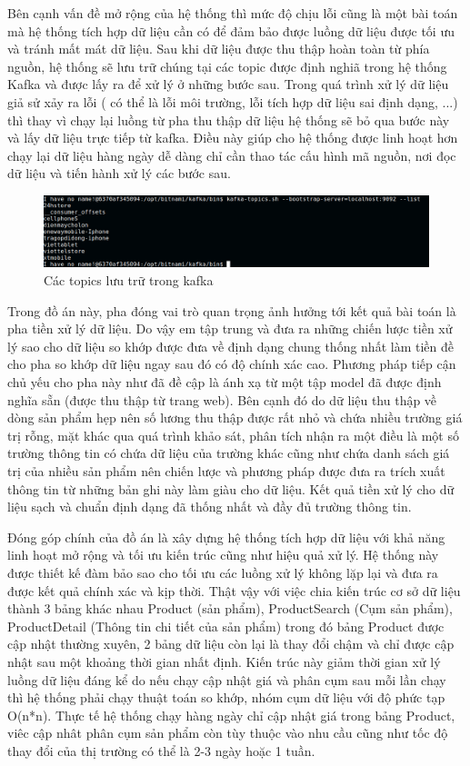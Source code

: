 \documentclass[../DoAn.tex]{subfiles}
\begin{document}
Bên cạnh vấn đề mở rộng của hệ thống thì mức độ chịu lỗi cũng là một bài toán mà hệ thống tích hợp dữ liệu cần có để đảm bảo được luồng dữ liệu được tối ưu và tránh mất mát dữ liệu. Sau khi dữ liệu được thu thập hoàn toàn từ phía nguồn, hệ thống sẽ lưu trữ chúng tại các topic được định nghiã trong hệ thống Kafka và được lấy ra để xử lý ở những bước sau. Trong quá trình xử lý dữ liệu giả sử xảy ra lỗi ( có thể là lỗi môi trường, lỗi tích hợp dữ liệu sai định dạng, ...) thì thay vì chạy lại luồng từ pha thu thập dữ liệu hệ thống sẽ bỏ qua bước này và lấy dữ liệu trực tiếp từ kafka. Điều này giúp cho hệ thống được linh hoạt hơn chạy lại dữ liệu hàng ngày dễ dàng chỉ cần thao tác cấu hình mã nguồn, nơi đọc dữ liệu và tiến hành xử lý các bước sau. 

\begin{figure}[H]
    \centering
    \includegraphics[scale=0.35]{Hinhve/kafka-topics.png}
    \caption{Các topics lưu trữ trong kafka}
    \label{fig:my_label2}
\end{figure}

Trong đồ án này, pha đóng vai trò quan trọng ảnh hưởng tới kết quả bài toán là pha tiền xử lý dữ liệu. Do vậy em tập trung và đưa ra những chiến lược tiền xử lý sao cho dữ liệu so khớp được đưa về định dạng chung thống nhất làm tiền đề cho pha so khớp dữ liệu ngay sau đó có độ chính xác cao. Phương pháp tiếp cận chủ yếu cho pha này như đã đề cập là ánh xạ từ một tập model đã được định nghĩa sẵn (được thu thập từ trang web). Bên cạnh đó do dữ liệu thu thập về dòng sản phẩm hẹp nên số lương thu thập được rất nhỏ và chứa nhiều trường giá trị rỗng, mặt khác qua quá trình khảo sát, phân tích nhận ra một điều là một số trường thông tin có chứa dữ liệu của trường khác cũng như chứa danh sách giá trị của nhiều sản phẩm nên chiến lược và phương pháp được đưa ra trích xuất thông tin từ những bản ghi này làm giàu cho dữ liệu. Kết quả tiền xử lý cho dữ liệu sạch và chuẩn định dạng đã thống nhất và đầy đủ trường thông tin.

Đóng góp chính của đồ án là xây dựng hệ thống tích hợp dữ liệu với khả năng linh hoạt mở rộng và tối ưu kiến trúc cũng như hiệu quả xử lý. Hệ thống này được thiết kế đàm bảo sao cho tối ưu các luồng xử lý không lặp lại và đưa ra được kết quả chính xác và kịp thời. Thật vậy với việc chia kiến trúc cơ sở dữ liệu thành 3 bảng khác nhau Product (sản phẩm), ProductSearch (Cụm sản phẩm), ProductDetail (Thông tin chi tiết của sản phẩm) trong đó bảng Product được cập nhật thường xuyên, 2 bảng dữ liệu còn lại là thay đổi chậm và chỉ được cập nhật sau một khoảng thời gian nhất định. Kiến trúc này giảm thời gian xử lý luồng dữ liệu đáng kể do nếu chạy cập nhật giá và phân cụm sau mỗi lần chạy thì hệ thống phải chạy thuật toán so khớp, nhóm cụm dữ liệu với độ phức tạp O(n*n). Thực tế hệ thống chạy hàng ngày chỉ cập nhật giá trong bảng Product, viêc cập nhât phân cụm sản phẩm còn tùy thuộc vào nhu cầu cũng như tốc độ thay đổi của thị trường có thể là 2-3 ngày hoặc 1 tuần.
\end{document}
